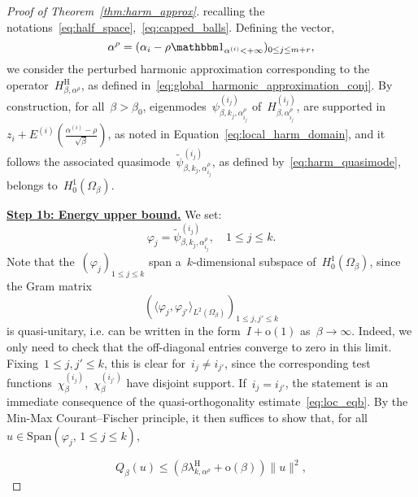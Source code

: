 \documentclass[10pt]{article}
\newcommand{\1}{\mathbbm 1}
\newcommand{\epsLimit}[1]{\alpha^{(#1)}} %
\newcommand{\halfSpace}[1]{E^{(#1)}}
\newcommand{\shift}{\rho} %
\renewcommand{\o}{\mathrm{o}}
\begin{document}
\begin{proof}[Proof of Theorem~\ref{thm:harm_approx}]
        recalling the notations~\eqref{eq:half_space},~\eqref{eq:capped_balls}.
        Defining the vector,
        \[\alpha^\shift = (\alpha_i - \shift\1_{\epsLimit{i} < +\infty})_{0\leq j\leq m+r},\]
        we consider the perturbed harmonic approximation corresponding to the operator~$H_{\beta,\alpha^\shift}^{\mathrm H}$, as defined in~\eqref{eq:global_harmonic_approximation_conj}.
        By construction, for all~$\beta>\beta_0$, eigenmodes~$\psi_{\beta,k_j,\alpha^\shift_{i_j}}^{(i_j)}$ of~$H_{\beta,\alpha^\shift_{i_j}}^{(i_j)}$, are supported in
        $z_i + \halfSpace{i}\left(\frac{\epsLimit{i}-\shift}{\sqrt\beta}\right)$, 
        as noted in Equation~\eqref{eq:local_harm_domain}, and it follows the associated quasimode~$\widetilde\psi_{\beta,k_j,\alpha^\shift_{i_j}}^{(i_j)}$, as defined by~\eqref{eq:harm_quasimode}, belongs to~$H_0^1(\Omega_\beta)$.
        
        {\underline{\bf Step 1b: Energy upper bound.}\newline}
        We set:
        \[\varphi_j = \widetilde\psi_{\beta,k_j,\alpha^\shift_{i_j}}^{(i_j)}, \quad 1\leq j\leq k.\]
        Note that the~$(\varphi_j)_{1\leq j \leq k}$ span a~$k$-dimensional subspace of~$H_0^1(\Omega_\beta)$, since the Gram matrix~$$\left(\langle \varphi_j,\varphi_{j'}\rangle_{L^2(\Omega_\beta)}\right)_{1\leq j,j'\leq k}$$ is quasi-unitary, i.e. can be written in the form~$I + \mathrm{o}(1)$ as~$\beta\to\infty$. Indeed, we only need to check that the off-diagonal entries converge to zero in this limit.
        Fixing~$1\leq j,j'\leq k$, this is clear for~$i_j \neq i_{j'}$, since the corresponding test functions~$\chi_\beta^{(i_j)}$,~$\chi_\beta^{(i_{j'})}$ have disjoint support. If~$i_j = i_{j'}$, the statement is an immediate consequence of the quasi-orthogonality estimate~\eqref{eq:loc_eqb}.
        By the Min-Max Courant--Fischer principle, it then suffices to show that, for all~$u\in \mathrm{Span}(\varphi_j,\,1\leq j \leq k)$,
        
        \begin{equation}
            \label{eq:thm1_ub}
            Q_\beta(u) \leq (\beta\lambda_{k,\alpha^\shift}^{\mathrm{H}}+\o(\beta))\|u\|^2,
        \end{equation}


\end{proof}
\end{document}
